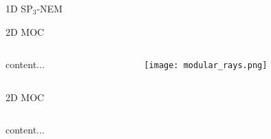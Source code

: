 \begin{frame}[t]{1D SP$_3$-NEM}
\end{frame}


\begin{frame}[t]{2D MOC}

\begin{columns}
  \begin{column}{0.6\textwidth}
    content...
  \end{column}
  \begin{column}{0.4\textwidth}
    \begin{figure}[h]
      \centering
      \texttt{[image: modular\_rays.png]}
    \end{figure}
  \end{column}
\end{columns}

\end{frame} 


\begin{frame}[t]{2D MOC}
  
  \begin{columns}
    \begin{column}{0.6\textwidth}
      content...
    \end{column}
    \begin{column}{0.4\textwidth}
      \begin{figure}[h]
        \centering
        \resizebox{!}{0.7\textheight}{}
      \end{figure}
    \end{column}
  \end{columns}

\end{frame} 